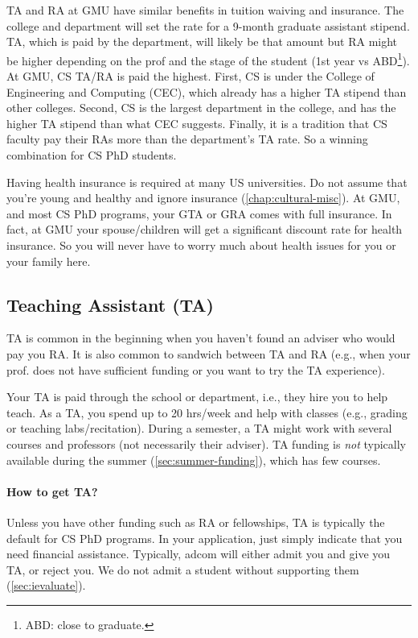 \documentclass[oneside,11pt]{book}
\newenvironment{commentbox}[1][]{
  \small
  \begin{marker}[\faChessPawn{}]
    {\textbf{#1}}
  }{
  \end{marker}
}
\begin{document}
\begin{commentbox}
  TA and RA at GMU have similar benefits in tuition waiving and insurance.  The college and department will set the rate for a 9-month graduate assistant stipend.  TA, which is paid by the department, will likely be that amount but RA might be higher depending on  the prof and the stage of the student (1st year vs \acrshort{ABD}\footnote{\acrlong{ABD}: close to graduate.}).\\

  At GMU, CS TA/RA is paid the highest.  First, CS is under the College of Engineering and Computing (CEC), which already has a higher TA stipend than other colleges.  Second, CS is the largest department in the college, and has the higher TA stipend than what CEC suggests.  Finally, it is a tradition that CS faculty pay their RAs more than the department's TA rate.  So a winning combination for CS PhD students.
  
  \tcblower
  Having health insurance is required at many US universities.  Do not assume that you're young and healthy and ignore insurance (\autoref{chap:cultural-misc}).  At GMU, and most CS PhD programs, your GTA or GRA comes with full insurance. In fact, at GMU your spouse/children will get a significant discount rate for health insurance.  So you will never have to worry much about health issues for you or your family here.
\end{commentbox}


\subsection{Teaching Assistant (TA)}\label{sec:ta}

TA is common in the beginning when you haven't found an adviser who would pay you RA. It is also common to sandwich between TA and RA (e.g., when your prof. does not have sufficient funding or you want to try the TA experience).

Your TA is paid through the school or department, i.e., they hire you to help teach.
As a TA, you spend up to 20 hrs/week and help with classes (e.g., grading or teaching labs/recitation).
During a semester, a TA might work with several courses and professors (not necessarily their adviser).  TA funding is \emph{not} typically available during the summer (\autoref{sec:summer-funding}), which has few courses. 

\paragraph{How to get TA?}  Unless you have other funding such as RA or fellowships, TA is typically the default for CS PhD programs. In your application, just simply indicate that you need financial assistance. Typically, adcom will either admit you and give you TA, or reject you. We do not admit a student without supporting them (\autoref{sec:ievaluate}).
\end{document}
